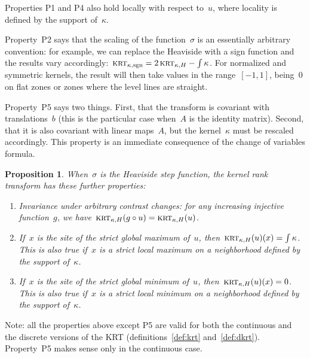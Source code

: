 \documentclass[12pt]{article}                  %
\newtheorem{proposition}{Proposition}
\begin{document}
Properties P1 and P4 also hold locally with respect to~$u$, where locality is
defined by the support of~$\kappa$.

Property~P2 says that the scaling of the function~$\sigma$ is an essentially
arbitrary convention: for example, we can replace the Heaviside with a sign
function and the results vary
accordingly:~$\textsc{krt}_{\kappa,\mathrm{sgn}}=2\,\textsc{krt}_{\kappa,H}-\int\kappa$.
For normalized and symmetric kernels, the result will then take values in
the range~$[-1,1]$, being~$0$ on flat zones or zones where the level lines
are straight.

Property~P5 says two things.  First, that the transform is covariant with
translations~$b$ (this is the particular case when~$A$ is the identity
matrix).  Second, that it is also covariant with linear maps~$A$, but the
kernel~$\kappa$ must be rescaled accordingly.  This property is an immediate
consequence of the change of variables formula.

\begin{proposition}
	When~$\sigma$ is the Heaviside step function, the kernel rank
	transform has these further properties:
	\begin{enumerate}
		\item[\bf H1] Invariance under arbitrary contrast changes: for
			any increasing injective function~$g$, we
			have~$\textsc{krt}_{\kappa,H}(g\circ
			u)=\textsc{krt}_{\kappa,H}(u)$.
		\item[\bf H2] If~$x$ is the site of the strict global
			maximum of~$u$,
			then~$\textsc{krt}_{\kappa,H}(u)(x)=\int\kappa$.  This is also
			true if~$x$ is a strict local maximum on a
			neighborhood defined by the support of~$\kappa$.
		\item[\bf H3] If~$x$ is the site of the strict global
			minimum of~$u$, then~$\textsc{krt}_{\kappa,H}(u)(x)=0$.  This
			is also true if~$x$ is a strict local minimum on a
			neighborhood defined by the support of~$\kappa$.
	\end{enumerate}
\end{proposition}

Note: all the properties above except P5 are valid for both the continuous
and the discrete versions of the KRT (definitions~\ref{def:krt}
and~\ref{def:dkrt}).  Property~P5 makes sense only in the continuous case.


%
%
%
%
\end{document}
